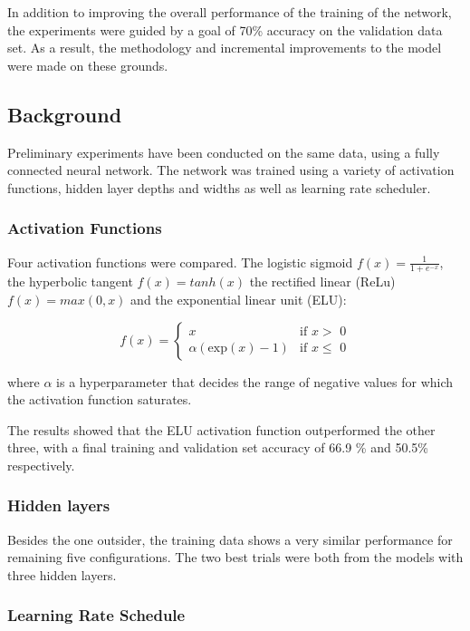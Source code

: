 \documentclass[]{article}
\begin{document}
In addition to improving the overall performance of the training of the network, the experiments were guided by a goal of 70\% accuracy on the validation data set. As a result, the methodology and incremental improvements to the model were made on these grounds. 

\subsection{Background} \label{background}

Preliminary experiments have been conducted on the same data, using a fully connected neural network. The network was trained using a variety of activation functions, hidden layer depths and widths as well as learning rate scheduler. 

\subsubsection{Activation Functions}

Four activation functions were compared. The logistic sigmoid $f(x)=\frac{1}{1+e^{-x}}$, the hyperbolic tangent $f(x)=tanh(x)$ the rectified linear (ReLu) $f(x)=max(0,x)$ and the exponential linear unit (ELU):

\begin{equation} \label{eq:elu}
f(x) = \begin{cases}
x &\text{if $x >$ 0}\\ \alpha (\text{exp}(x) - 1) &\text{if  $x \leq$ 0}
\end{cases}
\end{equation}

where \(\alpha\) is a hyperparameter that decides the range of negative values for which the activation function saturates.

The results showed that the ELU activation function outperformed the other three, with a final training and validation set accuracy of 66.9 \% and 50.5\% respectively. 

\subsubsection{Hidden layers}

Besides the one outsider, the training data shows a very similar performance for remaining five configurations. The two best trials were both from the models with three hidden layers.

\subsubsection{Learning Rate Schedule}
\end{document}
